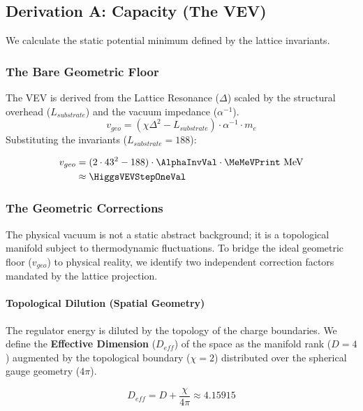 \subsection{Derivation A: Capacity (The VEV)}
We calculate the static potential minimum defined by the lattice invariants.

\subsubsection{The Bare Geometric Floor}
The VEV is derived from the Lattice Resonance ($\Delta$) scaled by the structural overhead ($L_{substrate}$) and the vacuum impedance ($\alpha^{-1}$).
\begin{equation}
v_{geo} = (\chi \Delta^2 - L_{substrate}) \cdot \alpha^{-1} \cdot m_e 
\end{equation}
Substituting the invariants ($L_{substrate} = 188$):

\begin{equation}
\begin{split}
v_{geo} &= (2 \cdot 43^2 - 188) \cdot \AlphaInvVal \cdot \MeMeVPrint \text{ MeV} \\
&\approx \HiggsVEVStepOneVal
\end{split}
\end{equation}

\subsubsection{The Geometric Corrections}
The physical vacuum is not a static abstract background; it is a topological manifold subject to thermodynamic fluctuations. To bridge the ideal geometric floor ($v_{geo}$) to physical reality, we identify two independent correction factors mandated by the lattice projection.

\paragraph{Topological Dilution (Spatial Geometry)}
The regulator energy is diluted by the topology of the charge boundaries. We define the \textbf{Effective Dimension} ($D_{eff}$) of the space as the manifold rank ($D=4$) augmented by the topological boundary ($\chi=2$) distributed over the spherical gauge geometry ($4\pi$).

\begin{equation}
D_{eff} = D + \frac{\chi}{4\pi} \approx 4.15915
\end{equation}

